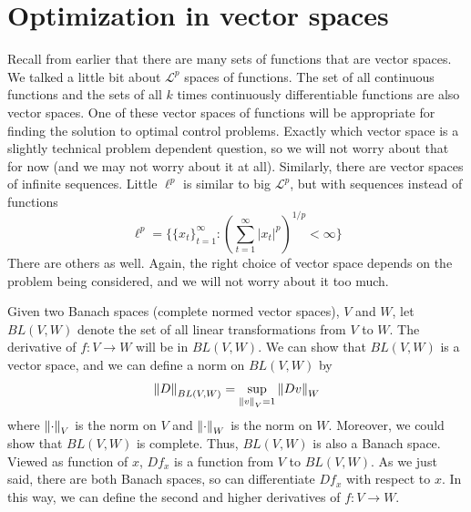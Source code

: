 \section{Optimization in vector spaces}

Recall from earlier that there are many sets of functions that are
vector spaces. We talked a little bit about $\mathcal{L}^p$ spaces of
functions. The set of all continuous functions and the sets of all $k$
times continuously differentiable functions are also vector
spaces. One of these vector spaces of functions will be appropriate
for finding the solution to optimal control problems. Exactly which
vector space is a slightly technical problem dependent question, so we
will not worry about that for now (and we may not worry about it at
all). Similarly, there are vector spaces of infinite sequences. Little
$\ell^p$ is similar to big $\mathcal{L}^p$, but with sequences instead
of functions
\[ \ell^p = \{\{x_t\}_{t=1}^\infty:
\left(\sum_{t=1}^\infty |x_t|^p\right)^{1/p} < \infty\} \]
There are others as well. Again, the right choice of vector space
depends on the problem being considered, and we will not worry about
it too much. 

Given two Banach spaces (complete normed vector spaces), $V$ and $W$,
let $BL(V,W)$ denote the set of all linear transformations from $V$ to
$W$. The derivative of $f:V \to W$ will be in $BL(V,W)$. We can show
that $BL(V,W)$ is a vector space, and we can define a norm on
$BL(V,W)$ by
\[ \left\Vert {D} \right\Vert_{BL(V,W)} = \sup_{\left\Vert {v} \right\Vert_V=1} \left\Vert {D v} \right\Vert_{W} \]
where $\left\Vert {\cdot} \right\Vert_V$ is the norm on $V$ and $\left\Vert {\cdot} \right\Vert_W$ is the
norm on $W$. Moreover, we could show that $BL(V,W)$ is complete. Thus,
$BL(V,W)$ is also a Banach space. Viewed as function of $x$, $Df_x$ is
a function from $V$ to $BL(V,W)$. As we just said, there are both
Banach spaces, so can differentiate $Df_x$ with respect to $x$. In 
this way, we can define the second and higher derivatives of $f:V \to
W$. 

